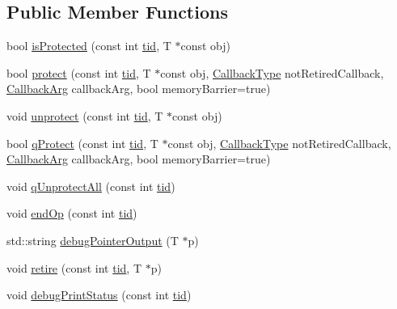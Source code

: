 \subsection*{Public Member Functions}
\begin{DoxyCompactItemize}
\item 
bool \hyperlink{classreclaimer__hazardptr_a660201dad3c7a18dce5a9551691f4869}{is\+Protected} (const int \hyperlink{microbench_2main_8cpp_a9ca9869868fe7e7a38a921cc7de4103f}{tid}, T $\ast$const obj)
\item 
bool \hyperlink{classreclaimer__hazardptr_a847fe92a7812e847d7ab5fc49048b734}{protect} (const int \hyperlink{microbench_2main_8cpp_a9ca9869868fe7e7a38a921cc7de4103f}{tid}, T $\ast$const obj, \hyperlink{globals_8h_a57f5c0d40b156d7d996492fb2f16e3cd}{Callback\+Type} not\+Retired\+Callback, \hyperlink{globals_8h_a3de64ef48066ac6430631c8b81a15345}{Callback\+Arg} callback\+Arg, bool memory\+Barrier=true)
\item 
void \hyperlink{classreclaimer__hazardptr_acf0f5797625cfe4838275015f421379d}{unprotect} (const int \hyperlink{microbench_2main_8cpp_a9ca9869868fe7e7a38a921cc7de4103f}{tid}, T $\ast$const obj)
\item 
bool \hyperlink{classreclaimer__hazardptr_aa32d2290c1950c91650cdf44397520b5}{q\+Protect} (const int \hyperlink{microbench_2main_8cpp_a9ca9869868fe7e7a38a921cc7de4103f}{tid}, T $\ast$const obj, \hyperlink{globals_8h_a57f5c0d40b156d7d996492fb2f16e3cd}{Callback\+Type} not\+Retired\+Callback, \hyperlink{globals_8h_a3de64ef48066ac6430631c8b81a15345}{Callback\+Arg} callback\+Arg, bool memory\+Barrier=true)
\item 
void \hyperlink{classreclaimer__hazardptr_a59e40ae1ae020e6d025be4217b68f184}{q\+Unprotect\+All} (const int \hyperlink{microbench_2main_8cpp_a9ca9869868fe7e7a38a921cc7de4103f}{tid})
\item 
void \hyperlink{classreclaimer__hazardptr_af35ab51d584f989c3a4fa2c00bcdcdf3}{end\+Op} (const int \hyperlink{microbench_2main_8cpp_a9ca9869868fe7e7a38a921cc7de4103f}{tid})
\item 
std\+::string \hyperlink{classreclaimer__hazardptr_a983e41cdf2bb6d4490fac7b954c5f579}{debug\+Pointer\+Output} (T $\ast$p)
\item 
void \hyperlink{classreclaimer__hazardptr_aecf56d8e41ea3da3c3a5aa6ec2aad0f0}{retire} (const int \hyperlink{microbench_2main_8cpp_a9ca9869868fe7e7a38a921cc7de4103f}{tid}, T $\ast$p)
\item 
void \hyperlink{classreclaimer__hazardptr_ae5c49710313a704bbccccebbbee05f64}{debug\+Print\+Status} (const int \hyperlink{microbench_2main_8cpp_a9ca9869868fe7e7a38a921cc7de4103f}{tid})

\end{DoxyCompactItemize}
